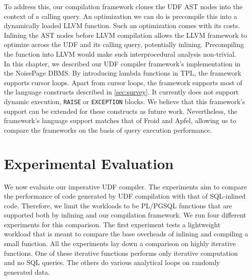 \documentclass[12pt]{cmuthesis}
\newcommand{\sysname}{NoisePage\xspace}
\begin{document}
    To address this, our compilation framework clones the UDF AST nodes into the context of a calling query. 
    An optimization we can do is precompile this into a dynamically loaded LLVM function. Such an optimization comes with its costs. Inlining the AST nodes before LLVM compilation allows the LLVM framework to optimize across the UDF and its calling query, potentially inlining. Precompiling the function into LLVM would make such interprocedural analysis non-trivial.\\
    
    
    
    In this chapter, we described our UDF compiler framework's implementation in the \sysname DBMS. By introducing lambda functions in TPL, the framework supports cursor loops. Apart from cursor loops, the framework supports most of the language constructs described in \cref{sec:survey}. It currently does not support dynamic execution, \texttt{RAISE} or \texttt{EXCEPTION} blocks. We believe that this framework's support can be extended for these constructs as future work. Nevertheless, the framework's language support matches that of Froid and Apfel, allowing us to compare the frameworks on the basis of query execution performance.\\
    


    
\chapter{Experimental Evaluation}
\label{sec:evaluation}
We now evaluate our imperative UDF compiler. The experiments aim to compare the performance of code generated by UDF compilation with that of SQL-inlined code. Therefore, we limit the workloads to be PL/PGSQL functions that are supported both by inlining and our compilation framework. We run four different experiments for this comparison. The first experiment tests a lightweight workload that is meant to compare the base overheads of inlining and compiling a small function.  All the experiments lay down a comparison on highly iterative functions. One of these iterative functions performs only iterative computation and no SQL queries. The others do various analytical loops on randomly generated data.\\
\end{document}
